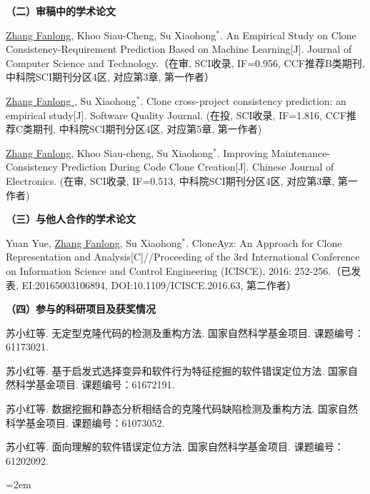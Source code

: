 \noindent\textbf{（二）审稿中的学术论文}
\begin{publist}
\item
\underline{Zhang Fanlong},  Khoo Siau-Cheng, Su Xiaohong{$^*$}. An Empirical Study on Clone Consistency-Requirement Prediction Based on Machine Learning[J]. Journal of Computer Science and Technology.（在审, SCI收录, IF=0.956, CCF推荐B类期刊, 中科院SCI期刊分区4区, 对应第3章, 第一作者）

\item
\underline{Zhang Fanlong }, Su Xiaohong{$^*$}. Clone cross-project consistency prediction: an empirical study[J]. Software Quality Journal. (在投, SCI收录, IF=1.816, CCF推荐C类期刊, 中科院SCI期刊分区4区, 对应第5章, 第一作者)

\item
\underline{Zhang Fanlong}, Khoo Siau-cheng, Su Xiaohong{$^*$}. Improving Maintenance-Consistency Prediction During Code Clone Creation[J]. Chinese Journal of Electronics. (在审, SCI收录, IF=0.513, 中科院SCI期刊分区4区, 对应第3章, 第一作者)

\end{publist}

\noindent\textbf{（三）与他人合作的学术论文}
\begin{publist}
\item
Yuan Yue, \underline{Zhang Fanlong},  Su Xiaohong{$^*$}. CloneAyz: An Approach for Clone Representation and Analysis[C]//Proceeding of the 3rd International Conference on Information Science and Control Engineering (ICISCE), 2016: 252-256.（已发表, EI:20165003106894, DOI:10.1109/ICISCE.2016.63, 第二作者）
\end{publist}




\noindent\textbf{（四）参与的科研项目及获奖情况}
\begin{publist}
\item	
苏小红等. 无定型克隆代码的检测及重构方法. 国家自然科学基金项目. 课题编号：61173021.
\item 
苏小红等. 基于启发式选择变异和软件行为特征挖掘的软件错误定位方法. 国家自然科学基金项目. 课题编号：61672191.
\item
苏小红等. 数据挖掘和静态分析相结合的克隆代码缺陷检测及重构方法. 国家自然科学基金项目. 课题编号：61073052.
\item
苏小红等. 面向理解的软件错误定位方法. 国家自然科学基金项目. 课题编号：61202092.

\end{publist}
\vfill
{}\hangindent=2em\noindent

\setlength{\parindent}{2em}
